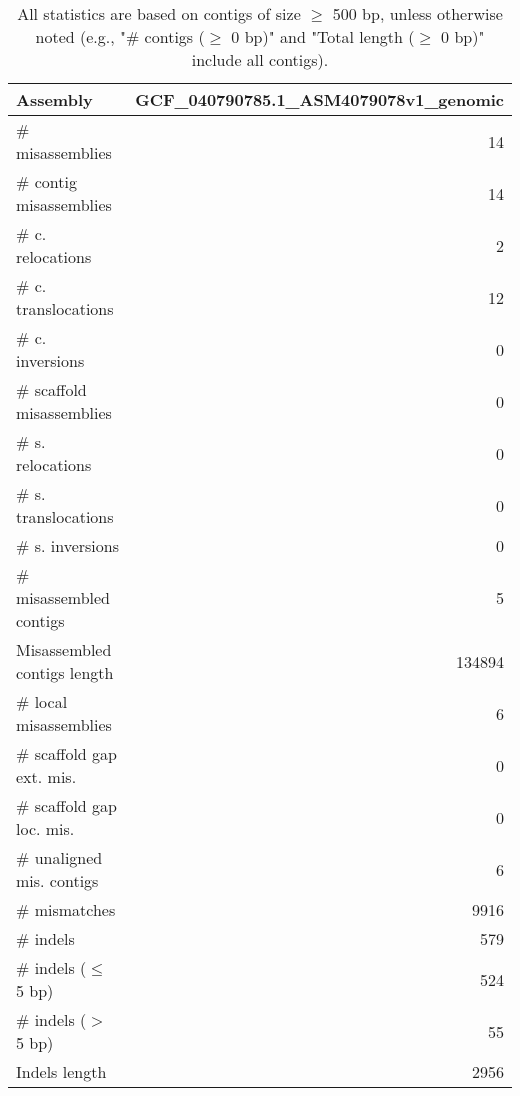 \documentclass[12pt,a4paper]{article}
\begin{document}
\begin{table}[ht]
\begin{center}
\caption{All statistics are based on contigs of size $\geq$ 500 bp, unless otherwise noted (e.g., "\# contigs ($\geq$ 0 bp)" and "Total length ($\geq$ 0 bp)" include all contigs).}
\begin{tabular}{|l*{1}{|r}|}
\hline
Assembly & GCF\_040790785.1\_ASM4079078v1\_genomic \\ \hline
\# misassemblies & 14 \\ \hline
\hspace{2mm}\# contig misassemblies & 14 \\ \hline
\hspace{5mm}\# c. relocations & 2 \\ \hline
\hspace{5mm}\# c. translocations & 12 \\ \hline
\hspace{5mm}\# c. inversions & 0 \\ \hline
\hspace{2mm}\# scaffold misassemblies & 0 \\ \hline
\hspace{5mm}\# s. relocations & 0 \\ \hline
\hspace{5mm}\# s. translocations & 0 \\ \hline
\hspace{5mm}\# s. inversions & 0 \\ \hline
\# misassembled contigs & 5 \\ \hline
Misassembled contigs length & 134894 \\ \hline
\# local misassemblies & 6 \\ \hline
\# scaffold gap ext. mis. & 0 \\ \hline
\# scaffold gap loc. mis. & 0 \\ \hline
\# unaligned mis. contigs & 6 \\ \hline
\# mismatches & 9916 \\ \hline
\# indels & 579 \\ \hline
\hspace{5mm}\# indels ($\leq$ 5 bp) & 524 \\ \hline
\hspace{5mm}\# indels ($>$ 5 bp) & 55 \\ \hline
Indels length & 2956 \\ \hline
\end{tabular}
\end{center}
\end{table}
\end{document}
